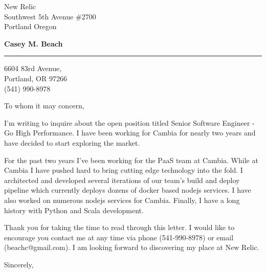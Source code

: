 \documentclass{letter} %
\begin{document}
\signature{Casey M. Beach}           %
\longindentation=0pt                       %
\let\raggedleft\raggedright                %
 
 
\begin{letter}{
New Relic \\
Southwest 5th Avenue \#2700 \\
Portland Oregon \\
}

\begin{center}
{\large\bf Casey M. Beach}
\end{center}
\medskip\hrule height 1pt
\begin{center}
6604 83rd Avenue,\\
Portland, OR 97266 \\
(541) 990-8978 
\end{center} 
\vspace{1in}

 
\opening{To whom it may concern,} 
\begin{flushleft} 

\noindent I'm writing to inquire about the open position titled Senior Software Engineer - Go High Performance. I have 
been working for Cambia for nearly two years and have decided to start exploring the market.

\noindent For the past two years I've been working for the PaaS team at Cambia. While at Cambia I have pushed hard
to bring cutting edge technology into the fold. I architected and developed several iterations of our team's build and 
deploy pipeline which currently deploys dozens of docker based nodejs services. I have also worked on numerous nodejs services
for Cambia. Finally, I have a long history with Python and Scala development.

\noindent Thank you for taking the time to read through this letter. I would like to encourage you
contact me at any time via phone (541-990-8978) or email (beachc@gmail.com). I am looking forward to 
discovering my place at New Relic.

\end{flushleft}
\closing{Sincerely,} 
\vfill %
\end{letter}
\end{document}
